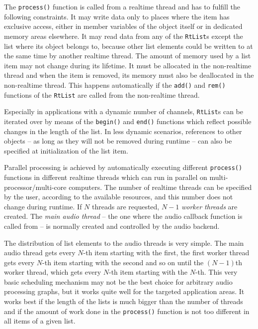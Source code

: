 \documentclass[11pt,letterpaper]{article}
\newcommand{\code}{\texttt}
\begin{document}
The \code{process()} function is called from a realtime thread and has to
fulfill the following constraints.
It may write data only to places where the item has exclusive access,
either in member variables of the object itself or in dedicated memory areas
elsewhere.
It may read data from any of the \code{RtList}s except the list where its
object belongs to, because other list elements could be written to at the same
time by another realtime thread.
The amount of memory used by a list item may not change during its lifetime.
It must be allocated in the non-realtime thread and when the item
is removed, its memory must also be deallocated in the non-realtime thread.
This happens automatically if the \code{add()} and \code{rem()} functions of the
\code{RtList} are called from the non-realtime thread.

Especially in applications with a dynamic number of channels, \code{RtList}s can be
iterated over by means of the \code{begin()} and \code{end()} functions which reflect
possible changes in the length of the list.
In less dynamic scenarios, references to other objects -- as long as they will
not be removed during runtime -- can also be specified at initialization of the
list item.

Parallel processing is achieved by automatically executing different
\code{process()} functions in different realtime threads which can run in
parallel on multi-processor/multi-core computers.
The number of realtime threads can be specified by the user, according to the
available resources, and this number does
not change during runtime.
If $N$ threads are requested, $N\!-\!1$ \emph{worker threads} are created.
The \emph{main audio thread} -- the one where the audio callback function is
called from -- is normally created and controlled by the audio backend.

The distribution of list elements to the audio threads is very simple.
The main audio thread gets every $N$-th item starting with the first, the first
worker thread gets every $N$-th item starting with the second and so on until
the $(N\!-\!1)$th worker thread, which gets every $N$-th item starting with the
$N$-th.
This very basic scheduling mechanism may not be the best choice for arbitrary
audio processing graphs, but it works quite well for the targeted application
areas.
It works best if the length of the lists is much bigger than the number of
threads and if the amount of work done in the \code{process()} function is not
too different in all items of a given list.
\end{document}
